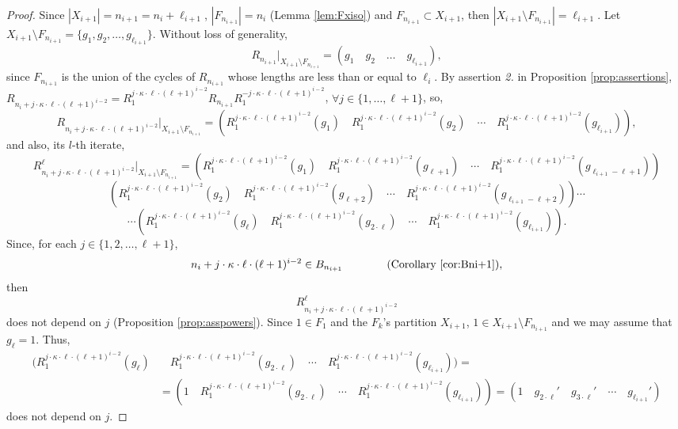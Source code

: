 \documentclass{article}
\begin{document}
\begin{proof}

Since $|X_{i+1}|=n_{i+1}=n_i+\ell_{i+1}$, $|F_{n_{i+1}}|=n_i$ (Lemma \ref{lem:Fxiso}) and $F_{n_{i+1}}\subset X_{i+1}$, then $|X_{i+1}\setminus F_{n_{i+1}}|=\ell_{i+1}$. Let $X_{i+1}\setminus F_{n_{i+1}}=\{g_1,g_2,\dots,g_{\ell_{i+1}}\}$. Without loss of generality,
\[R_{n_{i+1}}|_{X_{i+1}\setminus F_{n_{i+1}}}=(g_1\quad g_2\quad\dots\quad g_{\ell_{i+1}}) ,\]since $F_{n_{i+1}}$ is the union of the cycles of $R_{n_ {i+1}}$ whose lengths are less than or equal to $\ell_i$.
By assertion \textit{2.} in Proposition \ref{prop:assertions}, $R_{n_i+j\cdot\kappa\cdot\ell\cdot(\ell+1)^{i-2}}=R_1^{j\cdot\kappa\cdot\ell\cdot(\ell+1)^{i-2}}R_{n_{i+1}}R_1^{-j\cdot\kappa\cdot\ell\cdot(\ell+1)^{i-2}}$, $\forall j\in\{1,\dots,\ell+1\}$, so,
\[R_{n_i+j\cdot\kappa\cdot\ell\cdot(\ell+1)^{i-2}}|_{X_{i+1}\setminus F_{n_{i+1}}}=(R_1^{j\cdot\kappa\cdot\ell\cdot(\ell+1)^{i-2}}(g_1)\quad R_1^{j\cdot\kappa\cdot\ell\cdot(\ell+1)^{i-2}}(g_2)\quad\cdots\quad R_1^{j\cdot\kappa\cdot\ell\cdot(\ell+1)^{i-2}}(g_{\ell_{i+1}})),\]
and also, its $l$-th iterate,
\[R_{n_i+j\cdot\kappa\cdot\ell\cdot(\ell+1)^{i-2}}^\ell|_{X_{i+1}\setminus F_{n_{i+1}}}=(R_1^{j\cdot\kappa\cdot\ell\cdot(\ell+1)^{i-2}}(g_1)\quad R_1^{j\cdot\kappa\cdot\ell\cdot(\ell+1)^{i-2}}(g_{\ell+1})\quad\cdots\quad R_1^{j\cdot\kappa\cdot\ell\cdot(\ell+1)^{i-2}}(g_{\ell_{i+1}-\ell+1}))\]
\[(R_1^{j\cdot\kappa\cdot\ell\cdot(\ell+1)^{i-2}}(g_2)\quad R_1^{j\cdot\kappa\cdot\ell\cdot(\ell+1)^{i-2}}(g_{\ell+2})\quad\cdots\quad R_1^{j\cdot\kappa\cdot\ell\cdot(\ell+1)^{i-2}}(g_{\ell_{i+1}-\ell+2}))\cdots\]
\[\cdots(R_1^{j\cdot\kappa\cdot\ell\cdot(\ell+1)^{i-2}}(g_\ell)\quad R_1^{j\cdot\kappa\cdot\ell\cdot(\ell+1)^{i-2}}(g_{2\cdot\ell})\quad\cdots\quad R_1^{j\cdot\kappa\cdot\ell\cdot(\ell+1)^{i-2}}(g_{\ell_{i+1}})).\]
Since, for each $j\in \{ 1, 2, \dots , \ell +1 \}$, $$n_i+j\cdot\kappa\cdot\ell\cdot(\ell+1)^{i-2}\in B_{n_{i+1}} \qquad \qquad   (\text{Corollary \ref{cor:Bni+1}}) ,$$ then  $$R_{n_i+j\cdot\kappa\cdot\ell\cdot(\ell+1)^{i-2}}^\ell$$ does not depend on $j$ (Proposition \ref{prop:asspowers}). Since $1\in F_1$ and the $F_k$'s partition $X_{i+1}$, $1\in X_{i+1}\setminus F_{n_{i+1}}$ and we may assume that $g_\ell=1$. Thus,
\begin{align*}
(R_1^{j\cdot\kappa\cdot\ell\cdot(\ell+1)^{i-2}}(g_\ell)&\quad R_1^{j\cdot\kappa\cdot\ell\cdot (\ell+1)^{i-2}}(g_{2\cdot\ell})\quad\cdots\quad R_1^{j\cdot\kappa\cdot\ell\cdot(\ell+1)^{i-2}}(g_{\ell_{i+1}}))=\\
&=(1\quad R_1^{j\cdot\kappa\cdot\ell\cdot(\ell+1)^{i-2}}(g_{2\cdot\ell})\quad\cdots\quad R_1^{j\cdot\kappa\cdot\ell\cdot(\ell+1)^{i-2}}(g_{\ell_{i+1}}))=(1\quad g_{2\cdot\ell}'\quad g_{3\cdot\ell}'\quad\cdots\quad g_{\ell_{i+1}}')
\end{align*} does not depend on $j$.


\end{proof}
\end{document}
